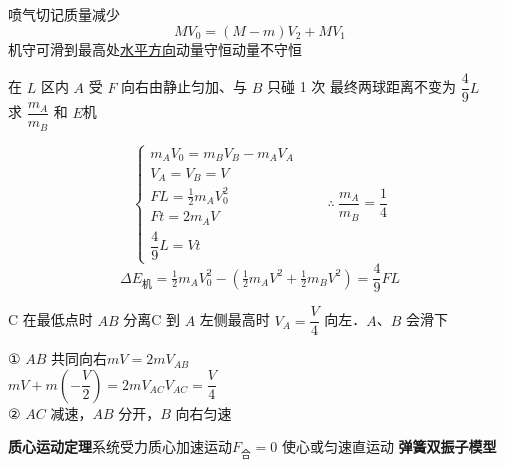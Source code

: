 喷气切记质量减少
\[
MV_0=(M-m)V_2+MV_1
\]
机守可滑到最高处\quad \underline{水平方向}动量守恒\quad 动量不守恒
\begin{problem}
在 $L$ 区内 $A$ 受 $F$ 向右由静止匀加、与 $B$ 只碰 1 次 最终两球距离不变为 $\dfrac49L$\\
求 $\dfrac{m_A}{m_B}$ 和 $E$机
\begin{solution}
\[
\begin{cases}
m_AV_0=m_BV_B-m_AV_A\\
V_A=V_B=V\\
FL=\tfrac12 m_AV_0^2\\
Ft=2m_AV\\
\dfrac49L=Vt
\end{cases}
\qquad\therefore\ \dfrac{m_A}{m_B}=\dfrac14
\]
\[
\Delta E_{\text{机}}=\tfrac12 m_AV_0^2-\left(\tfrac12 m_AV^2+\tfrac12 m_BV^2\right)=\dfrac49FL
\]
\end{solution}
\end{problem}
\begin{problem}
C 在最低点时 $AB$ 分离\quad C 到 $A$ 左侧最高时 $V_A=\dfrac V4$ 向左．$A$、$B$ 会滑下
\begin{solution}
① $AB$ 共同向右\quad $mV=2mV_{AB}$\\
$mV+m\left(-\dfrac V2\right)=2mV_{AC}$\qquad $V_{AC}=\dfrac V4$\\
② $AC$ 减速，$AB$ 分开，$B$ 向右匀速
\end{solution}
\end{problem}
\textbf{质心运动定理}\quad 系统受力\quad 质心加速运动\quad $F_{\text{合}}=0$ 使心或匀速直运动
\textbf{弹簧双振子模型}

